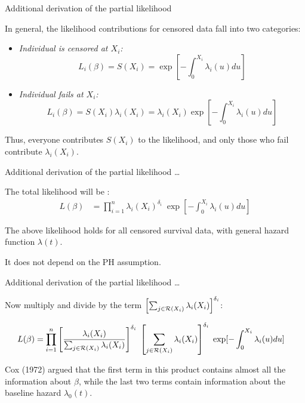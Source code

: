 \documentclass[ignorenonframetext,]{beamer}
\begin{document}
\begin{frame}{%
\protect\hypertarget{additional-derivation-of-the-partial-likelihood}{%
Additional derivation of the partial likelihood}}

In general, the likelihood contributions for censored data fall into two
categories:

\begin{itemize}
\item
  \emph{Individual is censored at \(X_i\):}
  \[L_i(\beta)= S(X_i) = \exp[-\int_0^{X_i} \lambda_i(u)du]\]
\item
  \emph{Individual fails at \(X_i\):}
  \[L_i(\beta)= S(X_i) \lambda_i(X_i) = \lambda_i(X_i) \exp[-\int_0^{X_i} \lambda_i(u)du]\]
\end{itemize}

Thus, everyone contributes \(S(X_i)\) to the likelihood, and only those
who fail contribute \(\lambda_i(X_i)\).

\end{frame}

\begin{frame}{%
\protect\hypertarget{additional-derivation-of-the-partial-likelihood-1}{%
Additional derivation of the partial likelihood \ldots}}

The total likelihood will be : \begin{align*}
L(\beta) &= \prod_{i=1}^n \lambda_i(X_i)^{\delta_i} \;
\exp[-\int_0^{X_i} \lambda_i(u)du]
\end{align*}

The above likelihood holds for all censored survival data, with general
hazard function \(\lambda(t)\).

It does not depend on the PH assumption.

\end{frame}

\begin{frame}{%
\protect\hypertarget{additional-derivation-of-the-partial-likelihood-2}{%
Additional derivation of the partial likelihood \ldots}}

Now multiply and divide by the term
\(\left[\sum_{j\in {\cal R}(X_i)} \lambda_i(X_i)\right]^{\delta_i}\):

\begin{align*}
L(\beta) &= \prod_{i=1}^n \left[\frac{\lambda_i(X_i)}{\sum_{j\in {\cal R}(X_i)}\lambda_i(X_i)}\right]^{\delta_i} \; 
\left[\sum_{j\in {\cal R}(X_i)} \lambda_i(X_i)\right]^{\delta_i} \;
\exp[-\int_0^{X_i} \lambda_i(u)du]
\end{align*}

Cox (1972) argued that the first term in this product contains almost
all the information about \(\beta\), while the last two terms contain
information about the baseline hazard \(\lambda_0(t)\).

\end{frame}
\end{document}
